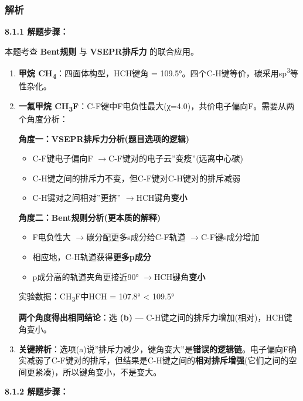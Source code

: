 \documentclass[a4paper,11pt]{ctexart}
\providecommand{\tightlist}{\setlength{\itemsep}{0pt}\setlength{\parskip}{0pt}}
\newcommand{\箭}{\ensuremath{\rightarrow}}
\newcommand{\左箭}{\ensuremath{\leftarrow}}
\newcommand{\上箭}{\ensuremath{\uparrow}}
\newcommand{\下箭}{\ensuremath{\downarrow}}
\newcommand{\衡}{\ensuremath{\rightleftharpoons}}
\newcommand{\双箭}{\ensuremath{\leftrightarrow}}
\newcommand{\约等于}{\ensuremath{\approx}}
\newcommand{\小于等于}{\ensuremath{\leq}}
\newcommand{\大于等于}{\ensuremath{\geq}}
\newcommand{\不等于}{\ensuremath{\neq}}
\newcommand{\西格马}{\ensuremath{\sigma}}
\newcommand{\派}{\ensuremath{\pi}}
\begin{document}
\subsubsection{解析}\label{ux89e3ux6790}

\textbf{8.1.1 解题步骤：}

本题考查 \textbf{Bent规则} 与 \textbf{VSEPR排斥力} 的联合应用。

\begin{enumerate}
\def\labelenumi{\arabic{enumi}.}
\item
  \textbf{甲烷 CH\textsubscript{4}}：四面体构型，HCH键角 = 109.5°。四个C-H键等价，碳采用sp\textsuperscript{3}等性杂化。
\item
  \textbf{一氟甲烷 CH\textsubscript{3}F}：C-F键中F电负性最大(χ=4.0)，共价电子偏向F。需要从两个角度分析：

  \textbf{角度一：VSEPR排斥力分析(题目选项的逻辑)}

  \begin{itemize}
  \tightlist
  \item
    C-F键电子偏向F \箭 C-F键对的电子云''变瘦''(远离中心碳)
  \item
    C-H键之间的排斥力不变，但C-F键对C-H键对的排斥减弱
  \item
    C-H键对之间相对''更挤'' \箭 HCH键角\textbf{变小}
  \end{itemize}

  \textbf{角度二：Bent规则分析(更本质的解释)}

  \begin{itemize}
  \tightlist
  \item
    F电负性大 \箭 碳分配更多s成分给C-F轨道 \箭 C-F键s成分增加
  \item
    相应地，C-H轨道获得\textbf{更多p成分}
  \item
    p成分高的轨道夹角更接近90° \箭 HCH键角\textbf{变小}
  \end{itemize}

  实验数据：CH\textsubscript{3}F中HCH = 107.8° \textless{} 109.5°

  \textbf{两个角度得出相同结论}：选 \textbf{(b)} --- C-H键之间的排斥力增加(相对)，HCH键角变小。
\item
  \textbf{关键辨析}：选项(a)说''排斥力减少，键角变大''是\textbf{错误的逻辑链}。电子偏向F确实减弱了C-F键对的排斥，但结果是C-H键之间的\textbf{相对排斥增强}(它们之间的空间更紧凑)，所以键角变小，不是变大。
\end{enumerate}

\textbf{8.1.2 解题步骤：}
\end{document}
